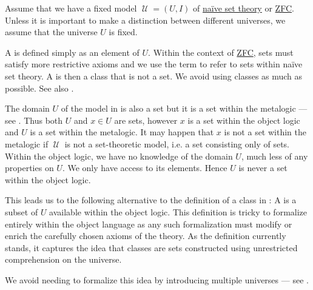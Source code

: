 \begin{definition}\label{def:set}
  Assume that we have a fixed model \( \mscrU = (U, I) \) of \hyperref[def:naive_set_theory]{na\"ive set theory} or \hyperref[def:zfc]{ZFC}.  Unless it is important to make a distinction between different universes, we assume that the universe \( U \) is fixed.

  A  is defined simply as an element of \( U \). Within the context of \hyperref[def:zfc]{ZFC}, sets must satisfy more restrictive axioms and we use the term  to refer to sets within na\"ive set theory. A  is then a class that is not a set. We avoid using classes as much as possible. See also .
\end{definition}

\begin{remark}\label{rem:proper_class}
  The domain \( U \) of the model in  is also a set but it is a set within the metalogic --- see . Thus both \( U \) and \( x \in U \) are sets, however \( x \) is a set within the object logic and \( U \) is a set within the metalogic. It may happen that \( x \) is not a set within the metalogic if \( \mscrU \) is not a set-theoretic model, i.e. a set consisting only of sets. Within the object logic, we have no knowledge of the domain \( U \), much less of any properties on \( U \). We only have access to its elements. Hence \( U \) is never a set within the object logic.

  This leads us to the following alternative to the definition of a class in : A  is a subset of \( U \) available within the object logic. This definition is tricky to formalize entirely within the object language as any such formalization must modify or enrich the carefully chosen axioms of the theory. As the definition currently stands, it captures the idea that classes are sets constructed using unrestricted comprehension on the universe.

  We avoid needing to formalize this idea by introducing multiple universes --- see .
\end{remark}

